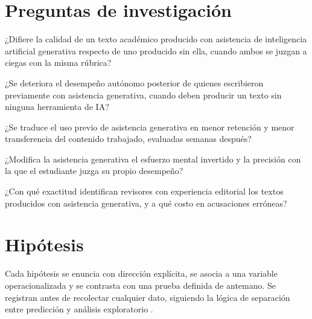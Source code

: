 \documentclass[12pt,a4paper,openany]{report}
\begin{document}
    \section{Preguntas de investigaci\'on}
    
    \begin{description}[leftmargin=2.2cm,style=nextline,font=\bfseries\sffamily]
        \item[PI1.] ¿Difiere la calidad de un texto acad\'emico producido con asistencia de inteligencia artificial generativa respecto de uno producido sin ella, cuando ambos se juzgan a ciegas con la misma r\'ubrica?
        \item[PI2.] ¿Se deteriora el desempe\~no aut\'onomo posterior de quienes escribieron previamente con asistencia generativa, cuando deben producir un texto sin ninguna herramienta de IA?
        \item[PI3.] ¿Se traduce el uso previo de asistencia generativa en menor retenci\'on y menor transferencia del contenido trabajado, evaluadas semanas despu\'es?
        \item[PI4.] ¿Modifica la asistencia generativa el esfuerzo mental invertido y la precisi\'on con la que el estudiante juzga su propio desempe\~no?
        \item[PI5.] ¿Con qu\'e exactitud identifican revisores con experiencia editorial los textos producidos con asistencia generativa, y a qu\'e costo en acusaciones err\'oneas?
    \end{description}
    
    \section{Hip\'otesis}
    
    Cada hip\'otesis se enuncia con direcci\'on expl\'icita, se asocia a una variable operacionalizada y se contrasta con una prueba definida de antemano. Se registran antes de recolectar cualquier dato, siguiendo la l\'ogica de separaci\'on entre predicci\'on y an\'alisis exploratorio \citep{nosek2018preregistration}.
    
\end{document}
